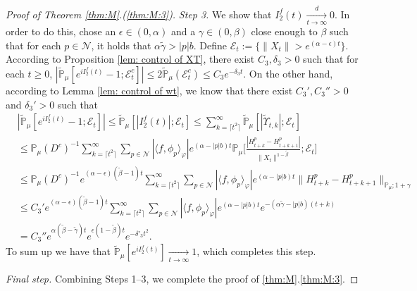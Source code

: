 \documentclass[12pt,a4paper]{amsart}
\theoremstyle{plain}
\theoremstyle{definition}
\numberwithin{equation}{section}
\begin{document}
\begin{proof}[Proof of Theorem \ref{thm:M}.(\ref{thm:M:3})]
\emph{Step 3.} We show that $I^f_2(t) \xrightarrow[t\to \infty]{d} 0$.
In order to do this, chose an $\epsilon \in (0,\alpha)$ and a $\gamma \in (0,\beta)$ close enough to $\beta$ such that for each $p\in \mathcal N$, it holds that $\alpha \tilde \gamma > |p|b$.
Define $\mathcal E_t:= \{\|X_t\| > e^{(\alpha - \epsilon)t}\}$.
According to Proposition \ref{lem: control of XT}, there exist $C_3, \delta_3 > 0$ such that for each $t\geq 0$, $|\widetilde {\mathbb {P}}_\mu[e^{i I_2^f(t)} - 1; \mathcal E_t^c]|\leq 2\widetilde {\mathbb {P}}_\mu(\mathcal E_t^c) \leq C_3 e^{- \delta_3 t}$.
On the other hand, according to Lemma \ref{lem: control of wt}, we know that there exist $C_3',C_3''>0$ and $\delta_3'>0$ such that
\begin{align}
	& |\widetilde {\mathbb {P}}_\mu[e^{i I_{2}^{f}(t)} - 1; \mathcal {E}_t]|
   \leq  \widetilde {\mathbb {P}}_\mu[ | I_{2}^{f}(t)|; \mathcal {E}_t]
   \leq \sum_{k = \lceil t^2\rceil}^\infty \widetilde {\mathbb {P}}_\mu[ |\widetilde {\Upsilon}_{t,k}|; \mathcal {E}_t]
  \\ & \leq \mathbb P_\mu(D^c)^{-1} \sum_{k = \lceil t^2\rceil}^\infty \sum_{p \in \mathcal N} |\langle f,\phi_p\rangle_\varphi| e^{(\alpha - |p|b)t}\mathbb {P}_\mu\Big[\frac{ |H_{t+k}^p - H_{t+k+1}^p|}{\|X_t\|^{1- \tilde \beta}}; \mathcal E_t\Big]
  \\ & \leq \mathbb P_\mu(D^c)^{-1} e^{(\alpha - \epsilon) (\tilde \beta - 1) t} \sum_{k = \lceil t^2\rceil}^\infty \sum_{p \in \mathcal N} |\langle f,\phi_p\rangle_\varphi| e^{(\alpha - |p|b)t}\|H_{t+k}^p - H_{t+k+1}^p\|_{\mathbb P_\mu; 1+\gamma}
  \\ & \leq C_3' e^{(\alpha - \epsilon) (\tilde \beta - 1) t} \sum_{k = \lceil t^2\rceil}^\infty \sum_{p \in \mathcal N} |\langle f,\phi_p\rangle_\varphi| e^{(\alpha - |p|b)t} e^{- (\alpha \tilde \gamma - |p|b)(t+k)}
  \\ & = C_3'' e^{ \alpha (\tilde \beta - \tilde \gamma) t } e^{ \epsilon (1 - \tilde \beta) t}e^{- \delta'_3 t^2}.
\end{align}
To sum up we have that $\widetilde {\mathbb P}_\mu[e^{iI_2^f(t)}] \xrightarrow[t\to \infty]{} 1$,
which completes this step.

\emph{Final step.} Combining Steps 1--3, we complete the proof of \ref{thm:M}.\eqref{thm:M:3}.
\end{proof}

\appendix
\section{ }
\end{document}
